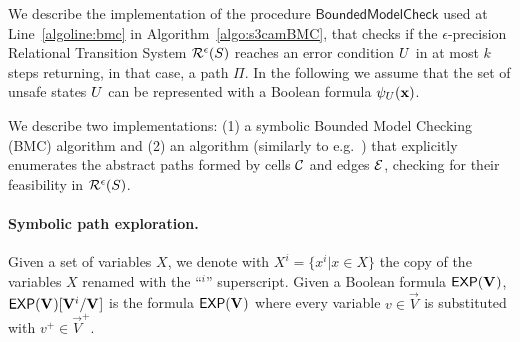 \newcommand{\unsafebmc}{\ensuremath{{\psi}_{\UnsafeStates}}}
\newcommand{\bvars}[1]{\ensuremath{{\vec{B}}^{#1}}}
\newcommand{\rvars}[1]{\ensuremath{{\vx}^{#1}}}
\newcommand{\vars}[1]{\ensuremath{{\vec{V}}^{#1}}}
\newcommand{\cellvar}[1]{\ensuremath{{cell}^{#1}}}
\newcommand{\initbmc}{\ensuremath{INIT}}
\newcommand{\encbmc}{\ensuremath{BMC}}
\newcommand{\transbmc}{\ensuremath{TRANS}}
\newcommand{\edgebmc}{\ensuremath{EDGE}}
\newcommand{\subs}[3]{\ensuremath{{#1}[{#2}/{#3}]}}

\newcommand{\abspathbmc}[0]{\ensuremath{\Pi_{abs}}}
\newcommand{\concbmc}[1]{\ensuremath{CONC_{{#1}}}}
%
We describe the implementation of the procedure
$\mathsf{BoundedModelCheck}$ used at Line~\ref{algoline:bmc} in
Algorithm~\ref{algo:s3camBMC},
that checks if the $\epsilon$-precision Relational Transition System
$\mathcal{R}^{\epsilon}(S)$ reaches an error condition
$U$ in at most $k$ steps returning, in that case, a path
$\Pi$. In the following we assume that the set of unsafe states
$U$ can be represented with a Boolean formula
$\unsafebmc(\vx)$.

We describe two implementations:
(1) a symbolic Bounded Model Checking~\cite{Biere+Others/99/Symbolic}
(BMC) algorithm and (2) an algorithm (similarly
to e.g.~\cite{DBLP:conf/fmcad/BuLWL08}) that explicitly enumerates the
abstract paths formed by cells $\mathcal{C}$ and edges $\mathcal{E}$,
checking for their feasibility in $\mathcal{R}^{\epsilon}(S)$.


\paragraph{Symbolic path exploration.}
%
%
Given a set of variables $X$, we denote with $X^i=\{x^i | x \in X\}$
the copy of the variables $X$ renamed with the ``$^i$'' superscript.
Given a Boolean formula $\exprs{\vars{}}$,
$\subs{\exprs{\vars{}}}{\vars{i}}{\vars{}}$ is the formula $\exprs{\vars{}}$
where every variable $v \in \vars{}$ is substituted with $v^+ \in \vars{+}$.

